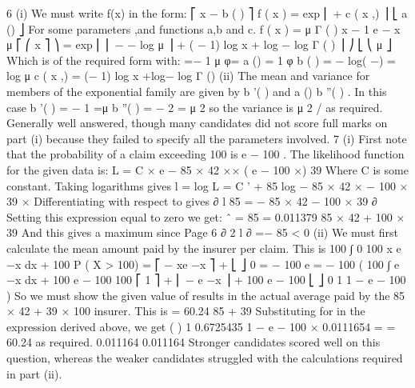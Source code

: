 \documentclass[a4paper,12pt]{article}
\begin{document}
6
(i)
We must write f(x) in the form:
⎡ x \theta  − b ( \theta  )
⎤
f ( x ) = exp ⎢
+ c ( x ,\phi  ) ⎥
⎣ a (\phi  )
⎦
For some parameters \theta  ,\phi  and functions a,b and c.
\alpha  \alpha 
f ( x ) =
μ \alpha  Γ ( \alpha  )
x
\alpha − 1
e
−
x \alpha 
μ
⎡ ⎛ x
⎤
⎞
= exp ⎢ ⎜ − − log μ ⎟ \alpha  + ( \alpha  − 1) log x + \alpha  log \alpha  − log Γ ( \alpha  ) ⎥
⎠
⎣ ⎝ μ
⎦
Which is of the required form with:
\theta =−
1
μ
φ=\alpha 
a (\phi  ) =
1
φ
b ( \theta  ) = − log( −\theta  ) = log μ
c ( x ,\phi  ) = (\phi  − 1) log x +\phi  log\phi  − log Γ (\phi  )
(ii)
The mean and variance for members of the exponential family are given by
b '( \theta  ) and a (\phi  ) b ''( \theta  ) .
In this case b '( \theta  ) = −
1
=μ
\theta 
b ''( \theta  ) = \theta  − 2 = μ 2 so the variance is μ 2 / \alpha  as required.
Generally well answered, though many candidates did not score full marks on part (i)
because they failed to specify all the parameters involved.
7
(i)
First note that the probability of a claim exceeding 100 is e − 100 \lambda  .
The likelihood function for the given data is:
L = C ×  e − 85 × 42 ×\lambda  × ( e − 100 ×\lambda  ) 39
Where C is some constant. Taking logarithms gives
l = log L = C ' + 85 log \lambda  − 85 × 42 × \lambda  − 100 × 39 × \lambda 
Differentiating with respect to \lambda  gives
∂ l 85
=
− 85 × 42 − 100 × 39
∂\lambda  \lambda 
Setting this expression equal to zero we get:
\lambda  ˆ =
85
= 0.011379
85 × 42 + 100 × 39
And this gives a maximum since
Page 6
∂ 2 l
∂
=−
85
< 0
(ii)
We must first calculate the mean amount paid by the insurer per claim. This is
100
∫
0
100
x \lambda  e −\lambda  x dx + 100 P ( X > 100) = ⎡ − xe −\lambda  x ⎤ +
⎣
⎦ 0
= − 100 e
=
− 100 \lambda 
(
100
∫ e
−\lambda  x
dx + 100 e − 100 
100
⎡ 1
⎤
+ ⎢ − e −\lambda  x ⎥ + 100 e − 100 \lambda 
⎣ \lambda 
⎦ 0
1
1 − e − 100 \lambda 
\lambda 
)
So we must show the given value of \lambda  results in the actual average paid by the
85 × 42 + 39 × 100
insurer. This is
= 60.24
85 + 39
Substituting for \lambda  in the expression derived above, we get
(
)
1
0.6725435
1 − e − 100 × 0.0111654 =
= 60.24 as required.
0.011164
0.011164
Stronger candidates scored well on this question, whereas the weaker candidates struggled
with the calculations required in part (ii).
\end{document}
